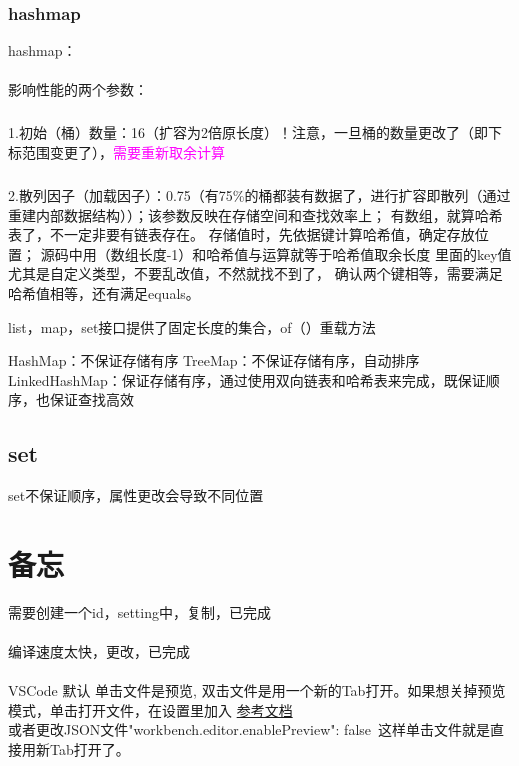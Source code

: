\documentclass[12pt]{ctexart}
\begin{document}
\subsubsection{hashmap}
hashmap：
\paragraph{}
影响性能的两个参数：\subparagraph{}
1.初始（桶）数量：16（扩容为2倍原长度）！注意，一旦桶的数量更改了（即下标范围变更了），\textcolor{magenta}{需要重新取余计算} \subparagraph{}
2.散列因子（加载因子）：0.75（有75\%的桶都装有数据了，进行扩容即散列（通过重建内部数据结构））；该参数反映在存储空间和查找效率上；
有数组，就算哈希表了，不一定非要有链表存在。
存储值时，先依据键计算哈希值，确定存放位置；
源码中用（数组长度-1）和哈希值与运算就等于哈希值取余长度
里面的key值尤其是自定义类型，不要乱改值，不然就找不到了，
确认两个键相等，需要满足哈希值相等，还有满足equals。


list，map，set接口提供了固定长度的集合，of（）重载方法

HashMap：不保证存储有序
TreeMap：不保证存储有序，自动排序
LinkedHashMap：保证存储有序，通过使用双向链表和哈希表来完成，既保证顺序，也保证查找高效

\subsection{set}
set不保证顺序，属性更改会导致不同位置

\section{备忘}
需要创建一个id，setting中，复制，已完成\paragraph{}
编译速度太快，更改，已完成\paragraph{}
VSCode 默认 单击文件是预览, 双击文件是用一个新的Tab打开。如果想关掉预览模式，单击打开文件，在设置里加入
\href{https://blog.csdn.net/qq_41865652/article/details/107024390}{参考文档}\\
或者更改JSON文件"workbench.editor.enablePreview": false\ 这样单击文件就是直接用新Tab打开了。
\end{document}
